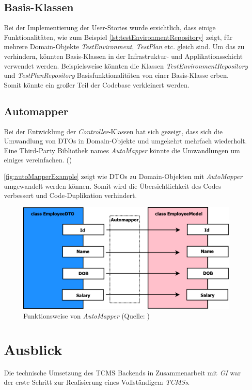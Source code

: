 \documentclass[a4paper, fontsize=11pt, parskip=half, twoside, headings=openright]{scrreprt}
\begin{document}
	\subsection{Basis-Klassen}
	Bei der Implementierung der User-Stories wurde ersichtlich, dass einige Funktionalitäten, wie zum Beispiel \autoref{lst:testEnvironmentRepository} zeigt, für mehrere Domain-Objekte \emph{TestEnvironment}, \emph{TestPlan} etc. gleich sind.
	Um das zu verhindern, könnten Basis-Klassen in der Infrastruktur- und Applikationsschicht verwendet werden.
	Beispielsweise könnten die Klassen \emph{TestEnvironmentRepository} und \emph{TestPlanRepository} Basisfunktionalitäten von einer Basis-Klasse erben.
	Somit könnte ein großer Teil der Codebase verkleinert werden.
	
	\subsection{Automapper}
	Bei der Entwicklung der \emph{Controller}-Klassen hat sich gezeigt, dass sich die Umwandlung von \ac{DTO}s in Domain-Objekte und umgekehrt mehrfach wiederholt.
	Eine Third-Party Bibliothek names \emph{AutoMapper} könnte die Umwandlungen um einiges vereinfachen. (\textcite{noauthor_automapper_nodate})
	
	\autoref{fig:autoMapperExample} zeigt wie \ac{DTO}s zu Domain-Objekten mit \emph{AutoMapper} umgewandelt werden können.
	Somit wird die Übersichtlichkeit des Codes verbessert und Code-Duplikation verhindert.
	
	\begin{figure}[ht]
		\centering
		\includegraphics[scale=0.3]{assets/AutoMapper_example.png}
		\caption{Funktionsweise von \emph{AutoMapper} (Quelle: \textcite{sanjay_implement_2020})}
		\label{fig:autoMapperExample}
	\end{figure}
	
	\section{Ausblick}
	Die technische Umsetzung des \ac{TCMS} Backends in Zusammenarbeit mit \emph{\acl{GI}} war der erste Schritt zur Realisierung eines Vollständigem \emph{\acl{TCMS}s}.
	
\end{document}
